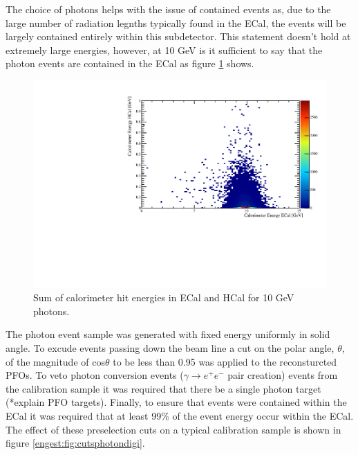 
The choice of photons helps with the issue of contained events as, due to the large number of radiation legnths typically found in the ECal, the events will be largely contained entirely within this subdetector.  This statement doesn't hold at extremely large energies, however, at 10 GeV is it sufficient to say that the photon events are contained in the ECal as figure \ref{engest:fig:energysplitphotondigi} shows.

\begin{figure}
  \includegraphics[width=\largefigwidth]{EnergyEstimators/Plots/Calibration/Digitsation/ECal/10GeVPhotonEnergyECalHCal.pdf}
  \caption[Sum of calorimeter hit energies in ECal and HCal for 10 GeV photons.]{Sum of calorimeter hit energies in ECal and HCal for 10 GeV photons.}
  \label{engest:fig:energysplitphotondigi}
\end{figure}

The photon event sample was generated with fixed energy uniformly in solid angle.  To excude events passing down the beam line a cut on the polar angle, $\theta$, of the magnitude of cos$\theta$ to be less than 0.95 was applied to the reconsturcted PFOs.  To veto photon conversion events ($\gamma \rightarrow e^{+}e^{-}$ pair creation) events from the calibration sample it was required that there be a single photon target (*explain PFO targets).  Finally, to ensure that events were contained within the ECal it was required that at least 99\% of the event energy occur within the ECal.  The effect of these preselection cuts on a typical calibration sample is shown in figure \ref{engest:fig:cutsphotondigi}.  

